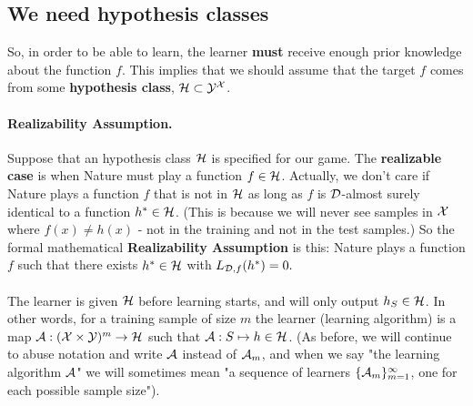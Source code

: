 

\subsection{We need hypothesis classes}

So, in order to be able to learn, the learner {\bf must} receive enough prior knowledge about the function $f$.
This implies that we should assume that the target $f$ comes from some \textbf{hypothesis class}, $\mathcal{H} \subset \mathcal{Y}^{\mathcal{X}}$. 

\paragraph{Realizability Assumption.} Suppose that an hypothesis class $\mathcal{H}$ is specified for our game. The {\bf realizable case} is when Nature must play a function $f\in\mathcal{H}$. Actually, we don't care if Nature plays a function $f$ that is not in $\mathcal{H}$ as long as $f$ is $\mathcal{D}$-almost surely identical to a function $h^*\in\mathcal{H}$.  (This is because we will never see samples in $\mathcal{X}$ where $f(x)\neq h(x)$ - not in the training and not in the test samples.) So the formal mathematical {\bf Realizability Assumption} is this: Nature plays a function $f$ such that there exists $h^*\in\mathcal{H}$ with $L_{\mathcal{D},f}(h^*)=0.$
\\~\\
The learner is given $\mathcal{H}$ before learning starts, and will only output $h_S\in\mathcal{H}$. In other words, for a training sample of size $m$ the learner (learning algorithm) is a map $\mathcal{A}:(\mathcal{X}\times\mathcal{Y})^m\to\mathcal{H}$ such that $\mathcal{A}:S\mapsto h\in\mathcal{H}$. (As before, we will continue to abuse notation and write $\mathcal{A}$ instead of $\mathcal{A}_m$, and when we say "the learning algorithm $\mathcal{A}$" we will sometimes mean "a sequence of learners $\{\mathcal{A}_m\}_{m=1}^\infty$, one for each possible sample size").

